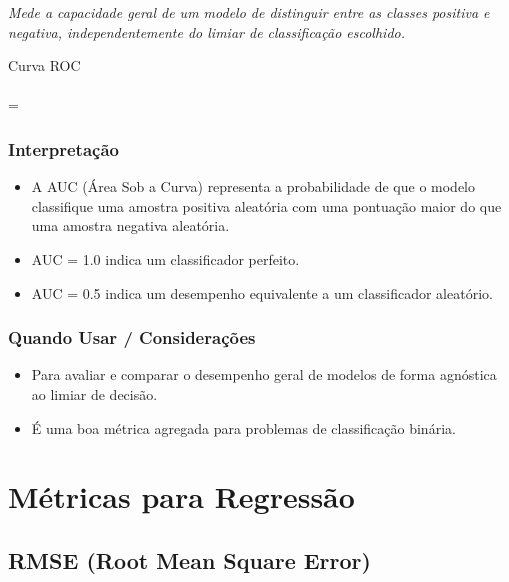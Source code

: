 \textit{Mede a capacidade geral de um modelo de distinguir entre as classes positiva e negativa, independentemente do limiar de classificação escolhido.}

\begin{equacaodestaque}{Curva ROC}
     \\
     \\
     = 
\end{equacaodestaque}

\subsubsection*{Interpretação}
\begin{itemize}
    \item A AUC (Área Sob a Curva) representa a probabilidade de que o modelo classifique uma amostra positiva aleatória com uma pontuação maior do que uma amostra negativa aleatória.
    \item AUC = 1.0 indica um classificador perfeito.
    \item AUC = 0.5 indica um desempenho equivalente a um classificador aleatório.
\end{itemize}

\subsubsection*{Quando Usar / Considerações}
\begin{itemize}
    \item Para avaliar e comparar o desempenho geral de modelos de forma agnóstica ao limiar de decisão.
    \item É uma boa métrica agregada para problemas de classificação binária.
\end{itemize}

\section{Métricas para Regressão}

\subsection{RMSE (Root Mean Square Error)}


